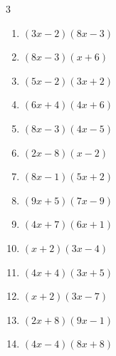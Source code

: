 \begin{multicols}{3}
\begin{enumerate}

  \item $(3x-2)(8x-3)$


  \item $(8x-3)(x+6)$


  \item $(5x-2)(3x+2)$


  \item $(6x+4)(4x+6)$


  \item $(8x-3)(4x-5)$


  \item $(2x-8)(x-2)$


  \item $(8x-1)(5x+2)$


  \item $(9x+5)(7x-9)$


  \item $(4x+7)(6x+1)$


\columnbreak %

  \item $(x+2)(3x-4)$


  \item $(4x+4)(3x+5)$


  \item $(x+2)(3x-7)$


  \item $(2x+8)(9x-1)$


  \item $(4x-4)(8x+8)$



\end{enumerate}
\end{multicols}
